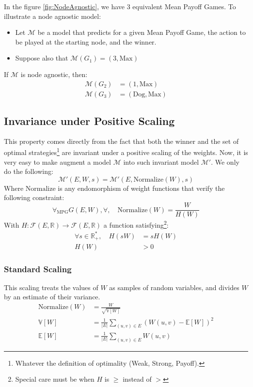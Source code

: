 \FloatBarrier
In the figure \ref{fig:NodeAgnostic}, we have $3$ equivalent Mean Payoff Games.
To illustrate a node agnostic model:
\begin{itemize}
	\item Let $\mathcal{M}$ be a model that predicts for a given Mean Payoff Game, the action to be played at the starting node, and the winner.
	\item Suppose also that $\mathcal{M}(G_1)=(3,\text{Max})$
\end{itemize}
If $\mathcal{M}$ is node agnostic, then:
\begin{align*}
	\mathcal{M}(G_2)&=(1,\text{Max})\\
	\mathcal{M}(G_3)&=(\text{Dog},\text{Max})
\end{align*}
\subsection{Invariance under Positive Scaling}
\label{section:ModelDesign:Properties:Invariance}
This property comes directly from the fact that both the winner and the set of optimal strategies\footnote{Whatever the definition of optimality (Weak, Strong, Payoff).} are invariant under a positive scaling of the weights.
\newline
Now, it is very easy to make augment a model $\mathcal{M}$ into such invariant model $\mathcal{M}'.$ We only do the following:
$$
\mathcal{M}'(E,W,s)=\mathcal{M}'(E,\text{Normalize}(W),s)
$$
Where $\text{Normalize}$ is any endomorphism of weight functions that verify the following constraint:
$$
\forall_{\text{MPG}}G(E,W),\forall ,\quad \text{Normalize}(W)=\frac{W}{H(W)}
$$
With $H:\mathscr{F}(E,\mathbb{R})\rightarrow \mathscr{F}(E,\mathbb{R})$ a function satisfying\footnote{Special care must be when $H$ is $\ge$ instead of $>$}:
\begin{align*}
	\forall s\in\mathbb{R}_+^*,\quad H(sW)&=sH(W) \\
	H(W)&> 0
\end{align*}

\subsubsection{Standard Scaling}
This scaling treats the values of $W$ as samples of random variables, and divides $W$ by an estimate of their variance. 
\begin{align*}
	\text{Normalize}(W)&=\frac{W}{\sqrt{\mathbb{V}[W]}}\\
	\mathbb{V}[W]&=\frac{1}{\lvert E \rvert} \sum_{(u,v)\in E}(W(u,v)-\mathbb{E}[W])^2 \\
	\mathbb{E}[W]&=\frac{1}{\lvert E \rvert}\sum_{(u,v)\in E}W(u,v) 
\end{align*}



